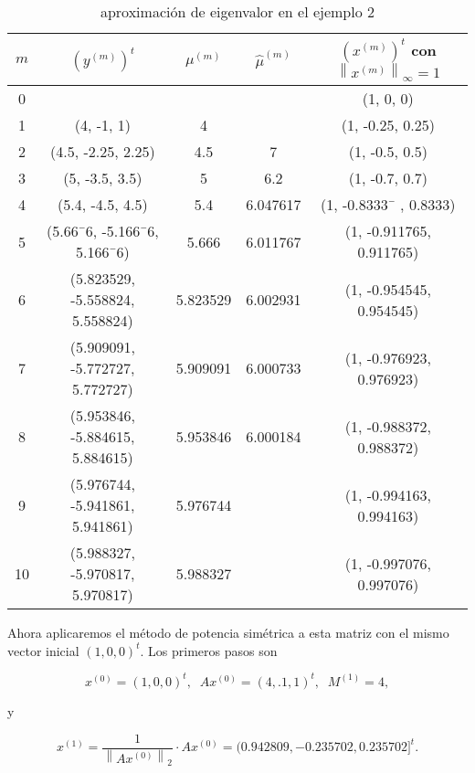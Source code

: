 \documentclass{report}
\numberwithin{subsection}{section} %
\begin{document}
    \begin{table}[h!]
        \centering
        \caption{aproximación de eigenvalor en el ejemplo 2}
        \label{tab:ej2}
        \begin{tabular}{|ccccc|} \hline
            $m$ & $(y^{(m)})^t$ & $\mu^{(m)}$ & $\hat{\mu}^{(m)}$ & $(x^{(m)})^t$ con $\left\|x^{(m)}\right\|_{\infty} = 1$ \\ \hline
            0  &                                   &            &           &  (1, 0, 0) \\
            1  &  (4, -1, 1)                       &  4         &           &  (1, -0.25, 0.25) \\
            2  &  (4.5, -2.25, 2.25)               &  4.5       & 7         &  (1, -0.5, 0.5) \\
            3  &  (5, -3.5, 3.5)                   &  5         & 6.2       &  (1, -0.7, 0.7) \\
            4  &  (5.4, -4.5, 4.5)                 &  5.4       & 6.047617  &  (1, -0.8333¯ , 0.8333) \\
            5  &  (5.66¯6, -5.166¯6, 5.166¯6)      &  5.666     & 6.011767  &  (1, -0.911765, 0.911765) \\
            6  &  (5.823529, -5.558824, 5.558824)  &  5.823529  & 6.002931  &  (1, -0.954545, 0.954545) \\
            7  &  (5.909091, -5.772727, 5.772727)  &  5.909091  & 6.000733  &  (1, -0.976923, 0.976923) \\
            8  &  (5.953846, -5.884615, 5.884615)  &  5.953846  & 6.000184  &  (1, -0.988372, 0.988372) \\
            9  &  (5.976744, -5.941861, 5.941861)  &  5.976744  &           &  (1, -0.994163, 0.994163) \\
            10 &  (5.988327, -5.970817, 5.970817)  &  5.988327  &           &  (1, -0.997076, 0.997076) \\ \hline
        \end{tabular}
    \end{table}

    Ahora aplicaremos el método de potencia simétrica a esta matriz con el mismo vector inicial $(1, 0, 0)^t$. Los primeros pasos son

    $$x^{(0)} = (1, 0, 0)^t , \;\; Ax^{(0)} = (4,.1, 1)^t , \;\; M^{(1)} = 4,$$

    y

    $$x^{(1)} = \frac{1}{\left\|Ax^{(0)}\right\|_2}· Ax^{(0)} = (0.942809,-0.235702, 0.235702]^t.$$
\end{document}
